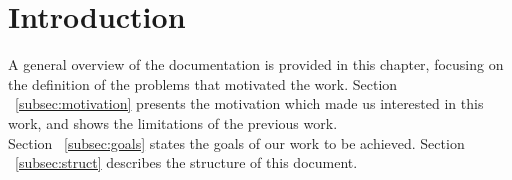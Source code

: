 
\chapter{Introduction} %

\label{Chapter1} %


A general overview of the documentation is provided in this chapter, focusing on the definition of the problems that motivated the work. Section ~\ref{subsec:motivation} presents the motivation which made us interested in this work, and shows the limitations of the previous work.\\
Section ~\ref{subsec:goals} states the goals of our work to be achieved. Section ~\ref{subsec:struct} describes the structure of this document.


